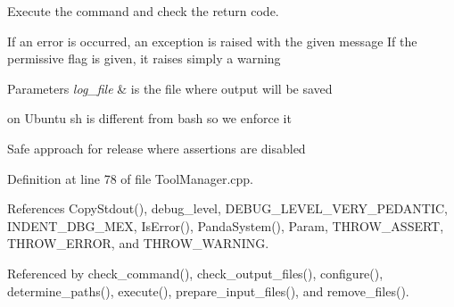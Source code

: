 Execute the command and check the return code. 

If an error is occurred, an exception is raised with the given message If the permissive flag is given, it raises simply a warning 
\begin{DoxyParams}{Parameters}
{\em log\+\_\+file} & is the file where output will be saved \\
\hline
\end{DoxyParams}
on Ubuntu sh is different from bash so we enforce it

Safe approach for release where assertions are disabled 

Definition at line 78 of file Tool\+Manager.\+cpp.



References Copy\+Stdout(), debug\+\_\+level, D\+E\+B\+U\+G\+\_\+\+L\+E\+V\+E\+L\+\_\+\+V\+E\+R\+Y\+\_\+\+P\+E\+D\+A\+N\+T\+IC, I\+N\+D\+E\+N\+T\+\_\+\+D\+B\+G\+\_\+\+M\+EX, Is\+Error(), Panda\+System(), Param, T\+H\+R\+O\+W\+\_\+\+A\+S\+S\+E\+RT, T\+H\+R\+O\+W\+\_\+\+E\+R\+R\+OR, and T\+H\+R\+O\+W\+\_\+\+W\+A\+R\+N\+I\+NG.



Referenced by check\+\_\+command(), check\+\_\+output\+\_\+files(), configure(), determine\+\_\+paths(), execute(), prepare\+\_\+input\+\_\+files(), and remove\+\_\+files().

